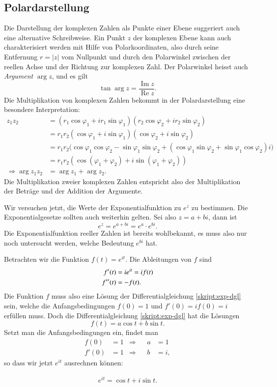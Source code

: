 \subsection{Polardarstellung}
Die Darstellung der komplexen Zahlen als Punkte einer Ebene suggeriert
auch eine alternative Schreibweise.
Ein Punkt $z$ der komplexen Ebene kann auch charakterisiert werden mit Hilfe von
Polarkoordinaten, also durch seine Entfernung $r=|z|$ vom Nullpunkt
und durch den Polarwinkel zwischen der reellen Achse und der Richtung
zur komplexen Zahl. Der Polarwinkel heisst auch {\em Argument} $\operatorname{arg}z$,
%
und es gilt
\[
\tan\operatorname{arg}z=\frac{\operatorname{Im}z}{\operatorname{Re}z}.
\]
Die Multiplikation von komplexen Zahlen bekommt in der Polardarstellung
eine besondere Interpretation:
\begin{align*}
z_1z_2
&=
(r_1\cos\varphi_1+ir_1\sin\varphi_1) (r_2\cos\varphi_2+ir_2\sin\varphi_2)
\\
&=
r_1r_2(\cos\varphi_1+i\sin\varphi_1) (\cos\varphi_2+i\sin\varphi_2)
\\
&=
r_1r_2\bigl(
\cos\varphi_1\cos\varphi_2-\sin\varphi_1\sin\varphi_2 +
(\cos\varphi_1\sin\varphi_2+\sin\varphi_1\cos\varphi_2)i\bigr)
\\
&=
r_1r_2(\cos(\varphi_1+\varphi_2)+i\sin(\varphi_1+\varphi_2))
\\
\Rightarrow \operatorname{arg}z_1z_2&=\arg z_1 + \arg z_2.
\end{align*}
Die Multiplikation zweier komplexen Zahlen entspricht also der
Multiplikation der Beträge und der Addition der Argumente.

Wir versuchen jetzt, die Werte der Exponentialfunktion zu $e^z$ zu
bestimmen.
Die Exponentialgesetze sollten auch weiterhin gelten.
Sei also $z=a+bi$, dann ist
\[
e^z=e^{a+bi}=e^a\cdot e^{bi}.
\]
Die Exponentialfunktion reeller Zahlen ist bereits wohlbekannt, es muss
also nur noch untersucht werden, welche Bedeutung $e^{bi}$ hat.

Betrachten wir die Funktion $f(t)= e^{it}$. Die Ableitungen von $f$ sind
\begin{align}
f'(t)&=ie^{it}=if(t)\notag\\
f''(t)&=-f(t).\label{skript:exp-dgl}
\end{align}
Die Funktion $f$ muss also eine Lösung der Differentialgleichung
\eqref{skript:exp-dgl} sein, welche die Anfangsbedingungen $f(0)=1$ und
$f'(0)=if(0)=i$ erfüllen muss.
Doch die Differentialgleichung \eqref{skript:exp-dgl} hat die Lösungen
\[
f(t)=a\cos t+b\sin t.
\]
Setzt man die Anfangsbedingungen ein, findet man
\begin{align*}
f(0)&=1&\Rightarrow&&a&=1\\
f'(0)&=1&\Rightarrow&&b&=i,
\end{align*}
so dass wir jetzt $e^{it}$ ausrechnen können:
\begin{satz}[Euler]
\begin{align}
e^{it}=\cos t+i\sin t.
\label{skript:euler-formula}
\end{align}
\end{satz}
%

